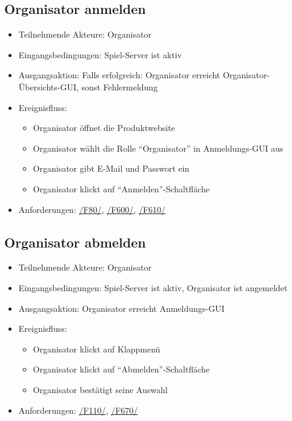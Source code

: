 \documentclass[a4paper]{scrreprt}
\begin{document}
    \subsection{Organisator anmelden}
    \begin{itemize}
        \item Teilnehmende Akteure: \Gls{Organisator}
        \item Eingangsbedingungen: \Gls{Spiel-Server} ist aktiv
        \item Ausgangsaktion: Falls erfolgreich: \Gls{Organisator} erreicht Organisator-Übersichts-GUI, sonst Fehlermeldung %
        \item Ereignisfluss:
        \begin{itemize}
            \item \Gls{Organisator} öffnet die Produktwebsite
            \item \Gls{Organisator} wählt die Rolle \enquote{\Gls{Organisator}} in Anmeldungs-GUI aus
            \item \Gls{Organisator} gibt E-Mail und Passwort ein
            \item \Gls{Organisator} klickt auf \enquote{Anmelden}-Schaltfläche
        \end{itemize}
        \item Anforderungen: \hyperlink{F80}{/F80/}, \hyperlink{F600}{/F600/},  \hyperlink{F610}{/F610/}
    \end{itemize}

    \subsection{Organisator abmelden}
    \begin{itemize}
        \item Teilnehmende Akteure: \Gls{Organisator}
        \item Eingangsbedingungen: \Gls{Spiel-Server} ist aktiv, \Gls{Organisator} ist angemeldet
        \item Ausgangsaktion: \Gls{Organisator} erreicht Anmeldungs-GUI
        \item Ereignisfluss:
        \begin{itemize}
            \item \Gls{Organisator} klickt auf Klappmenü
            \item \Gls{Organisator} klickt auf \enquote{Abmelden}-Schaltfläche
            \item \Gls{Organisator} bestätigt seine Auswahl
        \end{itemize}
        \item Anforderungen: \hyperlink{F110}{/F110/}, \hyperlink{F670}{/F670/}
    \end{itemize}
\end{document}
